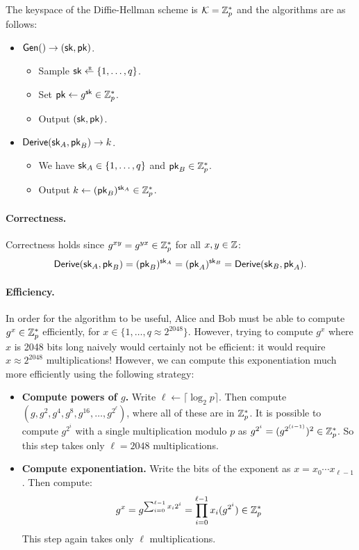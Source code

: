 The keyspace of the Diffie-Hellman scheme is $\mathcal{K} = \mathbb{Z}^*_p$
and the algorithms are as follows:
\begin{itemize}[noitemsep]
  \item $\mathsf{Gen}() \to ({\mathsf{sk}}, \mathsf{pk})$.
    \begin{itemize}[noitemsep]
      \item Sample $\sk \getsr \{1, \dots, q\}$.
      \item Set $\mathsf{pk} \gets g^{{\mathsf{sk}}} \in \mathbb{Z}^*_p$.
      \item Output $({\mathsf{sk}}, \mathsf{pk})$.
    \end{itemize}

  \item $\mathsf{Derive}({\mathsf{sk}}_A, \mathsf{pk}_B) \to k$.
    \begin{itemize}[noitemsep]
      \item We have ${\mathsf{sk}}_A \in \{1, \dots, q\}$ and $\mathsf{pk}_B \in \mathbb{Z}^*_p$.
      \item Output $k \gets (\mathsf{pk}_B)^{{\mathsf{sk}}_A} \in \mathbb{Z}^*_p$.
    \end{itemize}
\end{itemize}

\paragraph{Correctness.}
Correctness holds since $g^{xy}=g^{yx} \in \mathbb{Z}^*_p$ for all $x,y \in \mathbb{Z}$:
\begin{align*}
  \mathsf{Derive}({\mathsf{sk}}_A, \mathsf{pk}_B) = (\mathsf{pk}_B)^{{\mathsf{sk}}_A} = (\mathsf{pk}_A)^{{\mathsf{sk}}_B} = \mathsf{Derive}({\mathsf{sk}}_B, \mathsf{pk}_A).
\end{align*}


\paragraph{Efficiency.} In order for the algorithm to be useful,
Alice and Bob must be able to compute $g^x \in \mathbb{Z}^*_p$ efficiently,
for $x \in \{1, \dots, q \approx 2^{2048}\}$.
However, trying to compute $g^x$ where $x$ is 2048
bits long naively would certainly not be
efficient: it would require $x \approx 2^{2048}$ multiplications!
However, we can compute this exponentiation much more efficiently using
the following strategy:
\begin{itemize}[noitemsep]
  \item \textbf{Compute powers of $g$.}
        Write $\ell \gets \lceil \log_2 p \rceil$.
        Then compute $(g, g^2, g^4, g^{8}, g^{16}, \dots, g^{2^\ell})$,
        where all of these are in $\mathbb{Z}^*_p$.
        It is possible to compute $g^{2^{i}}$ with a single multiplication
        modulo $p$ as $g^{2^i} = (g^{2^{(i-1)}})^2 \in \mathbb{Z}^*_p$.
        So this step takes only $\ell = 2048$ multiplications.
  \item \textbf{Compute exponentiation.}
        Write the bits of the exponent as $x = x_0 \cdots x_{\ell-1}$.
        Then compute:
        \[ g^x = g^{\sum_{i = 0}^{\ell-1} x_i 2^i} = \prod_{i=0}^{\ell-1} x_i(g^{2^i}) \in \mathbb{Z}^*_p\] 
        This step again takes only $\ell$ multiplications.
\end{itemize}


